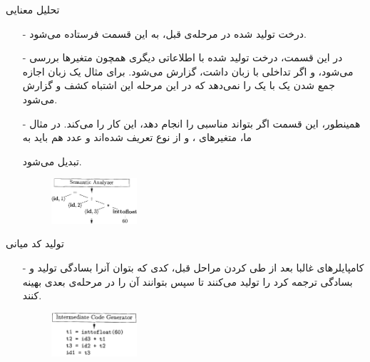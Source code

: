 \begin{frame}{تحلیل معنایی }
\begin{itemize}\itemr
\item[-]
درخت تولید شده در مرحله‌ی قبل، به این قسمت فرستاده می‌شود.

\item[-]
در این قسمت، درخت تولید شده با اطلاعاتی دیگری همچون 
متغیر‌ها بررسی می‌شود، و اگر تداخلی با زبان داشت، گزارش می‌شود. برای مثال یک زبان اجازه جمع شدن یک 
با یک
را نمی‌دهد که در این مرحله این اشتباه کشف و گزارش می‌شود.

\item[-]
همینطور، این قسمت اگر بتواند
مناسبی را انجام دهد، این کار را می‌کند. در مثال ما، متغیر‌های 
،
و 
از نوع
تعریف شده‌اند و عدد 
هم باید به 

تبدیل می‌شود.

\begin{figure}[H]
\begin{center}
\includegraphics[width=0.3\textwidth, height=0.31\textheight]{docs/images/semantic}
\end{center}
\end{figure}
\end{itemize}
\end{frame}


\begin{frame}{تولید کد میانی }
\begin{itemize}\itemr
\item[-]
کامپایلر‌های غالبا بعد از طی کردن مراحل قبل، کدی که بتوان آنرا بسادگی تولید و بسادگی ترجمه کرد را تولید می‌کنند تا سپس بتوانند آن را در مرحله‌ی بعدی بهینه کنند.
\vspace{5mm}
\begin{figure}[H]
\begin{center}
\includegraphics[width=0.3\textwidth, height=0.4\textheight, angle=1]{docs/images/intermediate}
\end{center}
\end{figure}
\end{itemize}
\end{frame}

